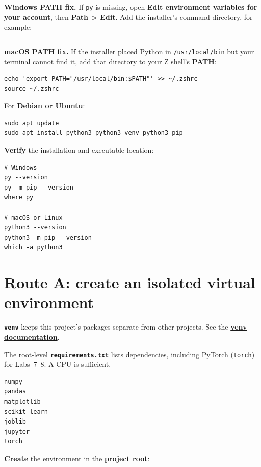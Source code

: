 \textbf{Windows PATH fix.} If \texttt{py} is missing, open \textbf{Edit environment variables for your account}, then \textbf{Path > Edit}. Add the installer's command directory, for example:

\begin{lstlisting}[style=utpterminal]
%LocalAppData%\Python\bin
\end{lstlisting}

\textbf{macOS PATH fix.} If the installer placed Python in \texttt{/usr/local/bin} but your terminal cannot find it, add that directory to your Z shell's \textbf{PATH}:

\begin{lstlisting}[style=utpterminal]
echo 'export PATH="/usr/local/bin:$PATH"' >> ~/.zshrc
source ~/.zshrc
\end{lstlisting}

For \textbf{Debian or Ubuntu}:

\begin{lstlisting}[style=utpterminal]
sudo apt update
sudo apt install python3 python3-venv python3-pip
\end{lstlisting}

\textbf{Verify} the installation and executable location:

\begin{lstlisting}[style=utpterminal]
# Windows
py --version
py -m pip --version
where py

# macOS or Linux
python3 --version
python3 -m pip --version
which -a python3
\end{lstlisting}

\section{Route A: create an isolated virtual environment}

\textbf{\texttt{venv}} keeps this project's packages separate from other projects. See the \href{https://docs.python.org/3/library/venv.html}{\textbf{venv documentation}}.

The root-level \textbf{\texttt{requirements.txt}} lists dependencies, including PyTorch (\texttt{torch}) for Labs~7--8. A CPU is sufficient.

\begin{lstlisting}[style=utpterminal]
numpy
pandas
matplotlib
scikit-learn
joblib
jupyter
torch
\end{lstlisting}

\textbf{Create} the environment in the \textbf{project root}:

